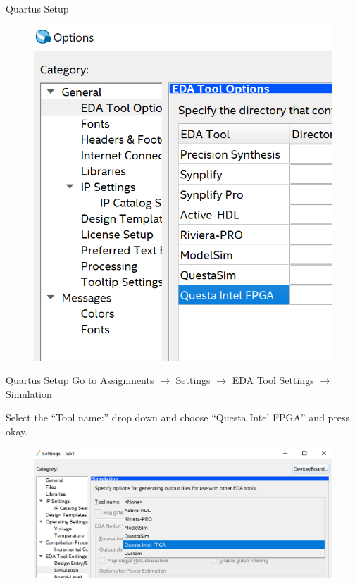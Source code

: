 \documentclass[fleqn]{beamer}
\newcommand{\quotes}[1]{``#1''}
\begin{document}
\begin{frame}{Quartus Setup}
\begin{multicols}{2}
\begin{figure}
        \includegraphics[scale=.5]{figures/edatool.png}
        \label{fig:my_label}
    \end{figure}
    \end{multicols}
\end{frame}
\begin{frame}{Quartus Setup}
    Go to Assignments $\longrightarrow$ Settings $\longrightarrow$ EDA Tool Settings $\longrightarrow$ Simulation\par
    Select the \quotes{Tool name:} drop down and choose \quotes{Questa Intel FPGA} and press okay.
    \begin{figure}
        \centering
        \includegraphics[scale=.5]{figures/simtool.png}
        \label{fig:my_label}
    \end{figure}
\end{frame}
\end{document}
